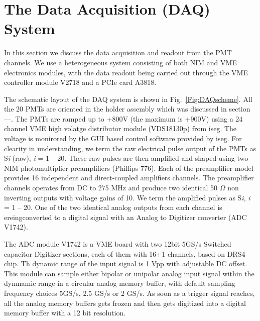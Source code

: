 \section{The Data Acquisition (DAQ) System }
\label{sec:DAQ}

{}

In this section we discuss the data acquisition and readout from the PMT 
channels. We use a heterogeneous system consisting of both 
NIM and VME electronics modules, with the data readout being carried out through 
the VME controller module V2718 and a PCIe card A3818. 

The schematic layout 
of the DAQ system is shown in Fig.~{\ref{Fig:DAQscheme}}. All the 20 PMTs 
are oriented in the holder assembly which was discussed in section---. 
The PMTs are ramped up to +800V (the maximum is +900V) using a 24 channel 
VME high volatge distributor module (VDS18130p) from iseg. The voltage is 
monirored by the GUI based control software provided by iseg. 
For clearity in understanding, we term the raw electrical pulse output of 
the PMTs as S{\it i} (raw), {\it i} = 1 -- 20. These raw pulses are then 
amplified and shaped using two NIM photomultiplier preamplifiers (Phillips 776). 
Each of the preamplifier model provides 16 independent  and direct-coupled 
amplifiers channels. The preamplifier channels operates from DC to 275 MHz and 
produce two identical 50 $\Omega$ non inverting outputs with voltage gains of 10. 
We term the amplified pulses as S{\it i}, {\it i} = 1 -- 20. One of the 
two identical analog outputs from each channel is ereingconverted to a digital 
signal with an Analog to Digitizer converter (ADC V1742). 

The ADC module V1742 
is a VME board with two 12bit 5GS/s Switched capacitor Digitizer sections, 
each of them with 16+1 channels, based on DRS4 chip. Th dynamic range of the input 
signal is 1 Vpp with adjustable DC offset. This module can sample either bipolar or 
unipolar analog input signal within the dymnamic range in a circular 
analog memory buffer, with default sampling frequency choices 5GS/s, 2.5 GS/s 
or 2 GS/s. As soon as a trigger signal reaches, all the analog memory 
buffers gets frozen and then gets digitized into a digital memory buffer 
with a 12 bit resolution. 

